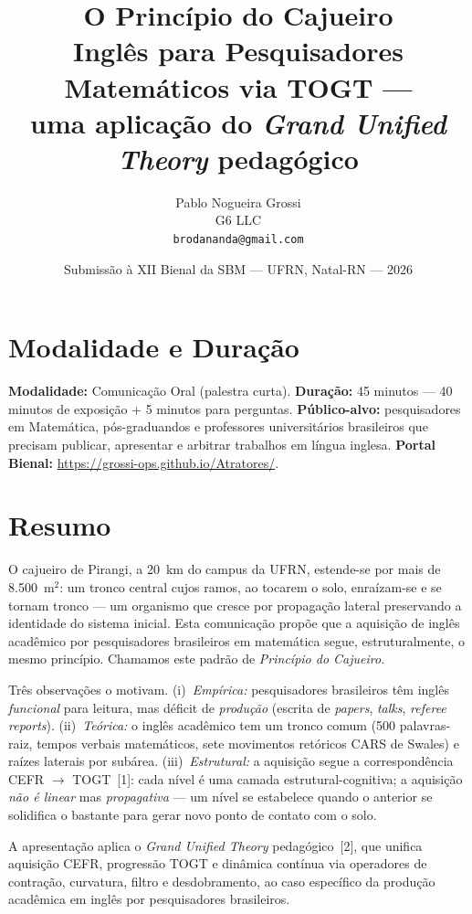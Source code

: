\documentclass[11pt,a4paper]{article}
\title{\textbf{O Princípio do Cajueiro}\\[0.3em]
\large Inglês para Pesquisadores Matemáticos via TOGT ---\\
uma aplicação do \emph{Grand Unified Theory} pedagógico}
\author{Pablo Nogueira Grossi\\
\small G6 LLC\\
\small \texttt{brodananda@gmail.com}}
\date{Submissão à XII Bienal da SBM --- UFRN, Natal-RN --- 2026}
\begin{document}
\maketitle

\section*{Modalidade e Duração}
\noindent
\textbf{Modalidade:} Comunicação Oral (palestra curta).\quad
\textbf{Duração:} 45 minutos --- 40 minutos de exposição + 5 minutos para perguntas.\quad
\textbf{Público-alvo:} pesquisadores em Matemática, pós-graduandos e professores universitários brasileiros que precisam publicar, apresentar e arbitrar trabalhos em língua inglesa.\quad
\textbf{Portal Bienal:} \url{https://grossi-ops.github.io/Atratores/}.

\section*{Resumo}

O cajueiro de Pirangi, a 20~km do campus da UFRN, estende-se por mais de 8.500~m$^2$: um tronco central cujos ramos, ao tocarem o solo, enraízam-se e se tornam tronco --- um organismo que cresce por propagação lateral preservando a identidade do sistema inicial. Esta comunicação propõe que a aquisição de inglês acadêmico por pesquisadores brasileiros em matemática segue, estruturalmente, o mesmo princípio. Chamamos este padrão de \emph{Princípio do Cajueiro}.

Três observações o motivam. (i)~\emph{Empírica:} pesquisadores brasileiros têm inglês \emph{funcional} para leitura, mas déficit de \emph{produção} (escrita de \emph{papers}, \emph{talks}, \emph{referee reports}). (ii)~\emph{Teórica:} o inglês acadêmico tem um tronco comum (500 palavras-raiz, tempos verbais matemáticos, sete movimentos retóricos CARS de Swales) e raízes laterais por subárea. (iii)~\emph{Estrutural:} a aquisição segue a correspondência CEFR $\to$ TOGT~[1]: cada nível é uma camada estrutural-cognitiva; a aquisição \emph{não é linear} mas \emph{propagativa} --- um nível se estabelece quando o anterior se solidifica o bastante para gerar novo ponto de contato com o solo.

A apresentação aplica o \emph{Grand Unified Theory} pedagógico~[2], que unifica aquisição CEFR, progressão TOGT e dinâmica contínua via operadores de contração, curvatura, filtro e desdobramento, ao caso específico da produção acadêmica em inglês por pesquisadores brasileiros.
\end{document}
